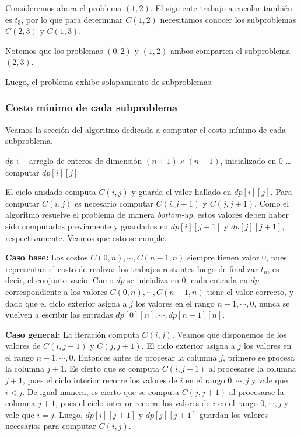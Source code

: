 \documentclass[a4paper, 10pt, twoside]{article}
\newenvironment{pseudo}[1][]{%
    \vspace{1em}%
    \begin{algorithmic}%
}
{%
    \end{algorithmic}%
    \vspace{1em}%
}
\newcommand{\To}{\textbf{to} }
\begin{document}
Consideremos ahora el problema $(1, 2)$. El siguiente trabajo a encolar también es $t_3$, por lo que para determinar $C(1, 2)$ necesitamos conocer los subproblemas $C(2, 3)$ y $C(1, 3)$.

Notemos que los problemas $(0, 2)$ y $(1, 2)$ ambos comparten el subproblema $(2, 3)$.

Luego, el problema exhibe solapamiento de subproblemas.


\subsubsection{Costo mínimo de cada subproblema}

Veamos la sección del algoritmo dedicada a computar el costo mínimo de cada subproblema.

\begin{pseudo}
  \State $dp \leftarrow $ arreglo de enteros de dimensión $(n + 1) \times (n + 1)$,
           inicializado en 0  
  \For{$j \leftarrow n - 1$ \To $0$}
    \For{$i \leftarrow 0$ \To $n - 1$}
      \State \ldots computar $dp[i][j]$
    \EndFor
  \EndFor
\end{pseudo}

El ciclo anidado computa $C(i, j)$ y guarda el valor hallado en $dp[i][j]$. Para computar $C(i, j)$ es necesario computar $C(i, j + 1)$ y $C(j, j + 1)$. Como el algoritmo resuelve el problema de manera \textit{bottom-up}, estos valores deben haber sido computados previamente y guardados en $dp[i][j + 1]$ y $dp[j][j + 1]$, respectivamente. Veamos que esto se cumple.

\textbf{Caso base:} Los costos $C(0, n), \cdots, C(n - 1, n)$ siempre tienen valor 0, pues representan el costo de realizar los trabajos restantes luego de finalizar $t_n$, es decir, el conjunto vacío. Como $dp$ se inicializa en 0, cada entrada en $dp$ correspondiente a los valores $C(0, n), \cdots, C(n - 1, n)$ tiene el valor correcto, y dado que el ciclo exterior asigna a $j$ los valores en el rango $n - 1, \cdots, 0$, nunca se vuelven a escribir las entradas $dp[0][n], \cdots, dp[n - 1][n]$.

\textbf{Caso general:} La iteración computa $C(i, j)$. Veamos que disponemos de los valores de $C(i, j + 1)$ y $C(j, j + 1)$. El ciclo exterior asigna a $j$ los valores en el rango $n - 1, \cdots, 0$. Entonces antes de procesar la columna $j$, primero se procesa la columna $j + 1$. Es cierto que se computa $C(i, j + 1)$ al procesarse la columna $j + 1$, pues el ciclo interior recorre los valores de $i$ en el rango $0, \cdots, j$ y vale que $i < j$. De igual manera, es cierto que se computa $C(j, j + 1)$ al procesarse la columna $j + 1$, pues el ciclo interior recorre los valores de $i$ en el rango $0, \cdots, j$ y vale que $i = j$. Luego, $dp[i][j + 1]$ y $dp[j][j + 1]$ guardan los valores necesarios para computar $C(i, j)$.
\end{document}

